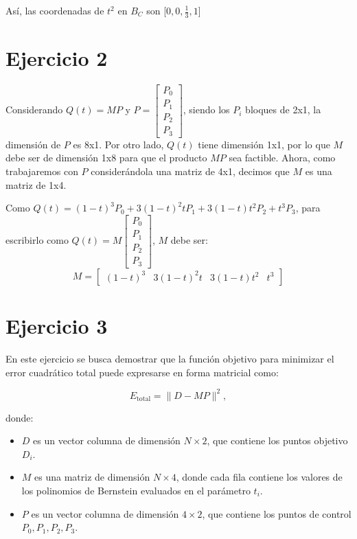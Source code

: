 \documentclass{article}
\begin{document}
Así, las coordenadas de $t^2$ en $B_C$ son [$0, 0, \frac{1}{3}, 1$]

\section*{Ejercicio 2}
Considerando $Q(t) = MP$ y $P = \begin{bmatrix}P_0 \\ P_1 \\ P_2 \\ P_3\end{bmatrix}$, siendo los $P_i$ bloques de 2x1, la dimensión de $P$ es 8x1. Por otro lado, $Q(t)$ tiene dimensión 1x1, por lo que $M$ debe ser de dimensión 1x8 para que el producto $MP$ sea factible. Ahora, como trabajaremos con $P$ considerándola una matriz de 4x1, decimos que $M$ es una matriz de 1x4.

Como $Q(t) = (1 - t)^3 P_0 + 3(1 - t)^2 t P_1 + 3(1 - t) t^2 P_2 + t^3 P_3$, para escribirlo como $Q(t) = M \begin{bmatrix}P_0 \\ P_1 \\ P_2 \\ P_3\end{bmatrix}$, $M$ debe ser:
$$
M = \begin{bmatrix} (1 - t)^3 & 3(1 - t)^2 t & 3(1 - t) t^2 & t^3 \end{bmatrix}
$$

\section*{Ejercicio 3}

En este ejercicio se busca demostrar que la función objetivo para minimizar el error cuadrático total puede expresarse en forma matricial como:

\[
E_{\text{total}} = \|D - MP\|^2,
\]

donde:
\begin{itemize}
    \item \( D \) es un vector columna de dimensión \( N \times 2 \), que contiene los puntos objetivo \( D_i \).
    \item \( M \) es una matriz de dimensión \( N \times 4 \), donde cada fila contiene los valores de los polinomios de Bernstein evaluados en el parámetro \( t_i \).
    \item \( P \) es un vector columna de dimensión \( 4 \times 2 \), que contiene los puntos de control \( P_0, P_1, P_2, P_3 \).
\end{itemize}
\end{document}
